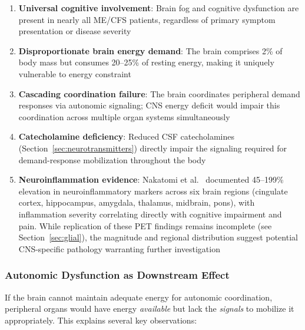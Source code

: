 \begin{enumerate}
    \item \textbf{Universal cognitive involvement}: Brain fog and cognitive dysfunction are present in nearly all ME/CFS patients, regardless of primary symptom presentation or disease severity

    \item \textbf{Disproportionate brain energy demand}: The brain comprises 2\% of body mass but consumes 20--25\% of resting energy, making it uniquely vulnerable to energy constraint

    \item \textbf{Cascading coordination failure}: The brain coordinates peripheral demand responses via autonomic signaling; CNS energy deficit would impair this coordination across multiple organ systems simultaneously

    \item \textbf{Catecholamine deficiency}: Reduced CSF catecholamines (Section~\ref{sec:neurotransmitters}) directly impair the signaling required for demand-response mobilization throughout the body

    \item \textbf{Neuroinflammation evidence}: Nakatomi et al.~\cite{Nakatomi2014neuroinflammation} documented 45--199\% elevation in neuroinflammatory markers across six brain regions (cingulate cortex, hippocampus, amygdala, thalamus, midbrain, pons), with inflammation severity correlating directly with cognitive impairment and pain. While replication of these PET findings remains incomplete (see Section~\ref{sec:glial}), the magnitude and regional distribution suggest potential CNS-specific pathology warranting further investigation
\end{enumerate}

\subsubsection{Autonomic Dysfunction as Downstream Effect}

If the brain cannot maintain adequate energy for autonomic coordination, peripheral organs would have energy \emph{available} but lack the \emph{signals} to mobilize it appropriately. This explains several key observations:

